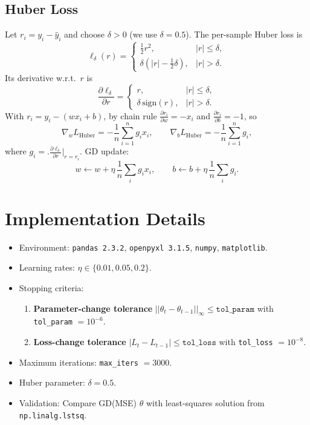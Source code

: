 \documentclass[11pt]{article}
\begin{document}
\subsection{Huber Loss}
Let $r_i=y_i-\hat y_i$ and choose $\delta>0$ (we use $\delta=0.5$). The per-sample Huber loss is
\[
\ell_\delta(r) =
\begin{cases}
\frac{1}{2}r^2,& |r|\le\delta,\\[3pt]
\delta(|r|-\frac{1}{2}\delta),& |r|>\delta.
\end{cases}
\]
Its derivative w.r.t.\ $r$ is
\[
\frac{\partial \ell_\delta}{\partial r}=
\begin{cases}
r,& |r|\le\delta,\\
\delta\,\mathrm{sign}(r),& |r|>\delta.
\end{cases}
\]
With $r_i=y_i-(w x_i + b)$, by chain rule $\frac{\partial r_i}{\partial w}=-x_i$ and $\frac{\partial r_i}{\partial b}=-1$, so
\[
\nabla_w L_{\mathrm{Huber}}=-\frac{1}{n}\sum_{i=1}^n g_i x_i,\qquad
\nabla_b L_{\mathrm{Huber}}=-\frac{1}{n}\sum_{i=1}^n g_i,
\]
where $g_i=\bigl.\frac{\partial \ell_\delta}{\partial r}\bigr|_{r=r_i}$.
GD update:
\[
w \leftarrow w + \eta \,\frac{1}{n}\sum_i g_i x_i,\qquad
b \leftarrow b + \eta \,\frac{1}{n}\sum_i g_i.
\]

\section{Implementation Details}
\begin{itemize}[leftmargin=1.5em]
  \item Environment: \texttt{pandas 2.3.2}, \texttt{openpyxl 3.1.5}, \texttt{numpy}, \texttt{matplotlib}.
  \item Learning rates: $\eta\in\{0.01, 0.05, 0.2\}$.
  \item Stopping criteria:
  \begin{enumerate}[nosep]
    \item \textbf{Parameter-change tolerance} $||\theta_{t}-\theta_{t-1}||_\infty \le \texttt{tol\_param}$ with \texttt{tol\_param} $=10^{-6}$.
    \item \textbf{Loss-change tolerance} $|L_t-L_{t-1}| \le \texttt{tol\_loss}$ with \texttt{tol\_loss} $=10^{-8}$.
  \end{enumerate}
  \item Maximum iterations: \texttt{max\_iters} $=3000$.
  \item Huber parameter: $\delta=0.5$.
  \item Validation: Compare GD(MSE) $\theta$ with least-squares solution from \texttt{np.linalg.lstsq}.
\end{itemize}
\end{document}
